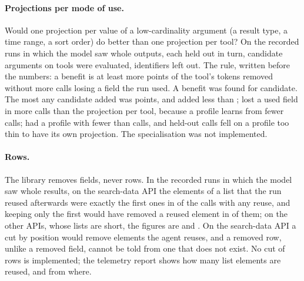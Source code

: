 \paragraph{Projections per mode of use.} Would one projection per value of a low-cardinality argument (a result
type, a time range, a sort order) do better than one projection per tool? On the \SthreeModesRuns{} recorded runs
in which the model saw whole outputs, each held out in turn, \SthreeModesCandidates{} candidate arguments on
\SthreeModesTools{} tools were evaluated, identifiers left out. The rule, written before the numbers: a benefit is at
least \SthreeModesThreshold{} more points of the tool's tokens removed without more calls losing a field the run
used. A benefit was found for \SthreeModesBenefit{} candidate. The most any candidate added was
\SthreeModesMaxPoints{} points, and \SthreeModesUnderOne{} added less than \SthreeModesSmall; \SthreeModesLoseMore{}
lost a used field in more calls than the projection per tool, because a profile learns from fewer calls;
\SthreeModesThin{} had a profile with fewer than \SthreeModesMinProfile{} calls, and \SthreeModesFallback{} held-out
calls fell on a profile too thin to have its own projection. The specialisation was not implemented.

\paragraph{Rows.} The library removes fields, never rows. In the \SthreeRowsRuns{} recorded runs in which the model
saw whole results, on the search-data API the elements of a list that the run reused afterwards were exactly the
first ones in \SthreeRowsTopSearch{} of the calls with any reuse, and keeping only the first \SthreeRowsCut{} would
have removed a reused element in \SthreeRowsCutFiveSearch{} of them; on the other APIs, whose lists are short, the
figures are \SthreeRowsTopOther{} and \SthreeRowsCutFiveOther. On the search-data API a cut by position would remove
elements the agent reuses, and a removed row, unlike a removed field, cannot be told from one that does not exist.
No cut of rows is implemented; the telemetry report shows how many list elements are reused, and from where.

